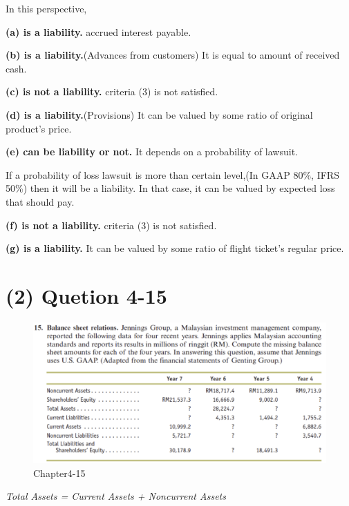 \documentclass[
  a4paper,
  DIV=11,
  numbers=noendperiod]{scrreprt}
\begin{document}
In this perspective,

\textbf{(a) is a liability.} accrued interest payable.

\textbf{(b) is a liability.}(Advances from customers) It is equal to
amount of received cash.

\textbf{(c) is not a liability.} criteria (3) is not satisfied.

\textbf{(d) is a liability.}(Provisions) It can be valued by some ratio
of original product's price.

\textbf{(e) can be liability or not.} It depends on a probability of
lawsuit.

If a probability of loss lawsuit is more than certain level,(In GAAP
80\%, IFRS 50\%) then it will be a liability. In that case, it can be
valued by expected loss that should pay.

\textbf{(f) is not a liability.} criteria (3) is not satisfied.

\textbf{(g) is a liability.} It can be valued by some ratio of flight
ticket's regular price.

\section*{(2) Quetion 4-15}\label{quetion-4-15}


\begin{figure}[H]

{\centering \includegraphics{images/재무회계_4-15.png}

}

\caption{Chapter4-15}

\end{figure}%

\emph{Total Assets = Current Assets + Noncurrent Assets}
\end{document}
